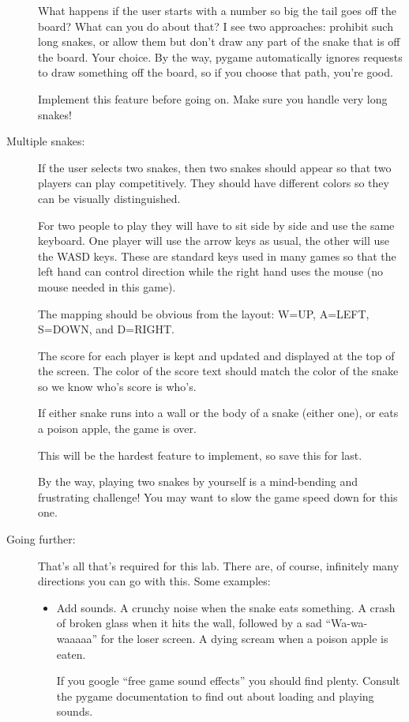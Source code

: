 \documentclass[12pt]{article}
\begin{document}
\begin{description}
What happens if the user starts with a number
so big the tail goes off the board?  What can you do
about that?  I see two approaches:  prohibit such long
snakes, or allow them but don't draw any part of the snake
that is off the board.  Your choice.  By the way, pygame 
automatically ignores requests to draw something
off the board, so if you choose that path, you're good.

Implement this feature before going on.  Make sure you handle
very long snakes!

\item[Multiple snakes:]  If the user selects two snakes,
then two snakes should appear so that two players
can play competitively.  They should have different
colors so they can be visually distinguished.

For two people to play they will have to sit side
by side and use the same keyboard.  One player will
use the arrow keys as usual, the other will use the WASD
keys.  These are standard keys used in many games so that
the left hand can control direction while the right
hand uses the mouse (no mouse needed in this game).

The mapping should be obvious from the layout:  W=UP,
A=LEFT, S=DOWN, and D=RIGHT.

The score for each player is kept and updated and displayed
at the top of the screen.  The color of the score text
should match the color of the snake so we know who's score is who's.

If either snake runs into a wall or the body of a snake
(either one), or eats a poison apple, the game is over.

This will be the hardest feature to implement, so save
this for last.

By the way, playing two snakes by yourself is a mind-bending
and frustrating challenge!  You may want to slow the game
speed down for this one.

\item[Going further:]  That's all that's required for this lab.
There are, of course, infinitely many directions you can go
with this.  Some examples:
\begin{itemize}
\item Add sounds.  A crunchy noise when the snake eats something.
A crash of broken glass when it hits the wall, followed by
a sad ``Wa-wa-waaaaa'' for the loser screen.  A dying scream
when a poison apple is eaten.

If you google ``free game sound effects'' you should find plenty.
Consult the pygame documentation to find out about loading and 
playing sounds.


\end{itemize}
\end{description}
\end{document}

